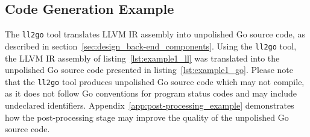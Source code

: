 
\subsection{Code Generation Example}
\label{app:code_generation_example}

The \texttt{ll2go} tool translates LLVM IR assembly into unpolished Go source code, as described in section~\ref{sec:design_back-end_components}. Using the \texttt{ll2go} tool, the LLVM IR assembly of listing~\ref{lst:example1_ll} was translated into the unpolished Go source code presented in listing~\ref{lst:example1_go}. Please note that the \texttt{ll2go} tool produces unpolished Go source code which may not compile, as it does not follow Go conventions for program status codes and may include undeclared identifiers. Appendix~\ref{app:post-processing_example} demonstrates how the post-processing stage may improve the quality of the unpolished Go source code.


